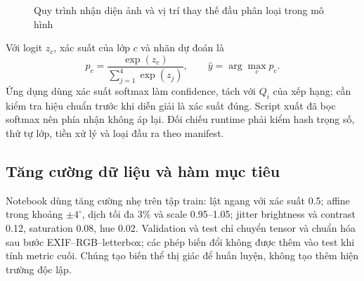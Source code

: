 \begin{figure}[H]\centering
{}
\caption{Quy trình nhận diện ảnh và vị trí thay thế đầu phân loại trong mô hình}
\label{fig:image-model-design}
\end{figure}

Với logit $z_c$, xác suất của lớp $c$ và nhãn dự đoán là
\begin{equation}
 p_c=\frac{\exp(z_c)}{\sum_{j=1}^{4}\exp(z_j)},\qquad \widehat y=\arg\max_c p_c.
 \label{eq:softmax}
\end{equation}
Ứng dụng dùng xác suất softmax làm confidence, tách với $Q_i$ của xếp hạng; cần kiểm tra hiệu chuẩn trước khi diễn giải là xác suất đúng. Script xuất đã bọc softmax nên phía nhận không áp lại. Đối chiếu runtime phải kiểm hash trọng số, thứ tự lớp, tiền xử lý và loại đầu ra theo manifest.

\subsection{Tăng cường dữ liệu và hàm mục tiêu}
Notebook dùng tăng cường nhẹ trên tập train: lật ngang với xác suất 0.5; affine trong khoảng $\pm4^\circ$, dịch tối đa 3\% và scale 0.95--1.05; jitter brightness và contrast 0.12, saturation 0.08, hue 0.02. Validation và test chỉ chuyển tensor và chuẩn hóa sau bước EXIF--RGB--letterbox; các phép biến đổi không được thêm vào test khi tính metric cuối. Chúng tạo biến thể thị giác để huấn luyện, không tạo thêm hiện trường độc lập.

